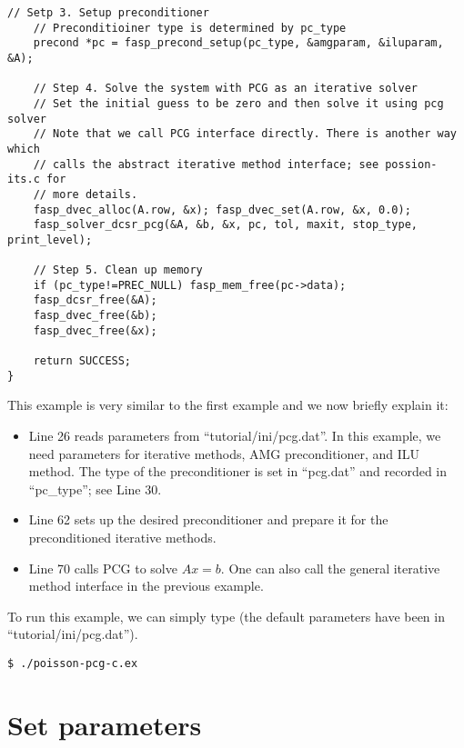 \documentclass[11pt]{memoir}
\begin{document}
\begin{lstlisting}[stepnumber=1,firstnumber=1]
    // Setp 3. Setup preconditioner
    // Preconditioiner type is determined by pc_type
    precond *pc = fasp_precond_setup(pc_type, &amgparam, &iluparam, &A);

    // Step 4. Solve the system with PCG as an iterative solver
    // Set the initial guess to be zero and then solve it using pcg solver
    // Note that we call PCG interface directly. There is another way which
    // calls the abstract iterative method interface; see possion-its.c for
    // more details.
    fasp_dvec_alloc(A.row, &x); fasp_dvec_set(A.row, &x, 0.0);
    fasp_solver_dcsr_pcg(&A, &b, &x, pc, tol, maxit, stop_type, print_level);

    // Step 5. Clean up memory
    if (pc_type!=PREC_NULL) fasp_mem_free(pc->data);
    fasp_dcsr_free(&A);
    fasp_dvec_free(&b);
    fasp_dvec_free(&x);

    return SUCCESS;
}
\end{lstlisting}
%
This example is very similar to the first example and we now briefly explain it:
\begin{itemize}
%
\item Line 26 reads parameters from ``tutorial/ini/pcg.dat''. In this example, we need parameters for iterative methods, AMG preconditioner, and ILU method. The type of the preconditioner is set in ``pcg.dat'' and recorded in ``pc\_type''; see Line 30.
%
\item Line 62 sets up the desired preconditioner and prepare it for the preconditioned iterative methods.
%
\item Line 70 calls PCG to solve $Ax=b$. One can also call the general iterative method interface in the previous example.
%
\end{itemize}
%
To run this example, we can simply type (the default parameters have been in ``tutorial/ini/pcg.dat'').
%
\begin{lstlisting}[numbers=none]
$ ./poisson-pcg-c.ex
\end{lstlisting}


\section{Set parameters}\label{sec:parameters}
\end{document}
